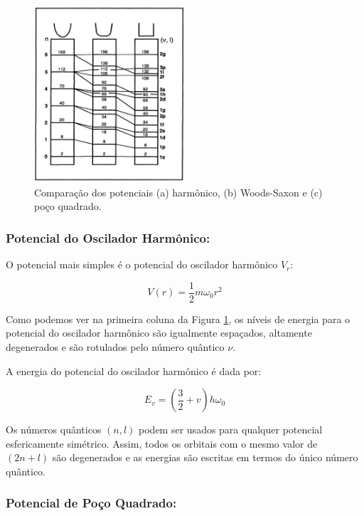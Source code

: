 \begin{figure}
  \centering
  \includegraphics[width=0.5\textwidth]{images/clusters/pocos}
  \caption{Comparação dos potenciais (a) harmônico, (b) Woods-Saxon e (c) poço quadrado. \cite{Heer}}
  \label{fig:pocos}
\end{figure}

\subsubsection{Potencial do Oscilador Harmônico:}

O potencial mais simples é o potencial do oscilador harmônico $V_{r}$:

\begin{equation}
    V(r)= \frac{1}{2}m\omega_0r^2
\end{equation}

Como podemos ver na primeira coluna da Figura \ref{fig:pocos}, os níveis de energia para o potencial do oscilador harmônico são igualmente espaçados, altamente degenerados  e são rotulados pelo número quântico $\nu$.


A energia do potencial do oscilador harmônico é dada por:

\begin{equation}
    E_{v}= \left(\frac{3}{2}+v\right)h\omega_0
\end{equation}

Os números quânticos $(n,l)$ podem ser usados para qualquer potencial esfericamente simétrico. Assim, todos os orbitais com o mesmo valor de $(2n+l)$ são degenerados e as energias são escritas em termos do único número quântico. 

\subsubsection{Potencial de Poço Quadrado:}

